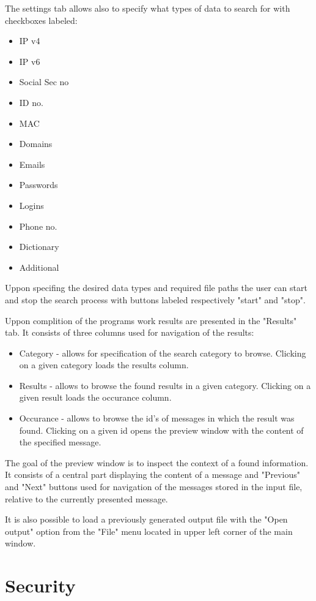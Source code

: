 \documentclass[a4paper,twoside,12pt]{book}
\begin{document}
The settings tab allows also to specify what types of data to search for with checkboxes labeled:

\begin{itemize}
   \item IP v4
   \item IP v6
   \item Social Sec no
   \item ID no.
   \item MAC
   \item Domains
   \item Emails
   \item Passwords
   \item Logins
   \item Phone no.
   \item Dictionary
   \item Additional
\end{itemize}

Uppon specifing the desired data types and required file paths the user can start and stop the search process
with buttons labeled respectively "start" and "stop".

Uppon complition of the programs work results are presented in the "Results" tab. It consists of three columns used for
navigation of the results: 
\begin{itemize}
   \item Category - allows for specification of the search category to browse. Clicking on a given category loads
   the results column.
   \item Results - allows to browse the found results in a given category. Clicking on a given result loads the 
   occurance column.
   \item Occurance - allows to browse the id's of messages in which the result was found. Clicking on a given id
   opens the preview window with the content of the specified message.
\end{itemize}

The goal of the preview window is to inspect the context of a found information. It consists of a central part 
displaying the content of a message and "Previous" and "Next" buttons used for navigation of the messages stored
in the input file, relative to the currently presented message.

It is also possible to load a previously generated output file with the "Open output" option from the
"File" menu located in upper left corner of the main window.

\section{Security}
\end{document}
